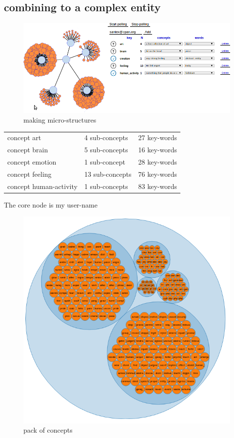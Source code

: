 \documentclass[15pt]{article}
\begin{document}
\vskip 1cm


\subsection{combining to a complex entity}
\begin{flushleft}	
\begin{figure}[htp]
\centering
\includegraphics[scale=0.55]{./img/micro-structure-creation-implement.png}
\caption{making micro-structures}
\label{}
\end{figure}
\end{flushleft}
\begin{tabular}{lll}
	concept art & 4 sub-concepts & 27 key-words\\
	concept brain & 5 sub-concepts &  16 key-words\\
	concept emotion & 1 sub-concept &  28 key-words\\
	concept feeling & 13 sub-concepts &  76 key-words\\
	concept human-activity & 1 sub-concepts &  83 key-words\\

\end{tabular}
\vskip 1cm
	The core node is my user-name
\begin{flushleft}	
\begin{figure}[htp]
\centering
\includegraphics[scale=0.80]{./img/circle.png}
\caption{pack of concepts}
\end{figure}
\end{flushleft}
\vskip 5cm
\end{document}
